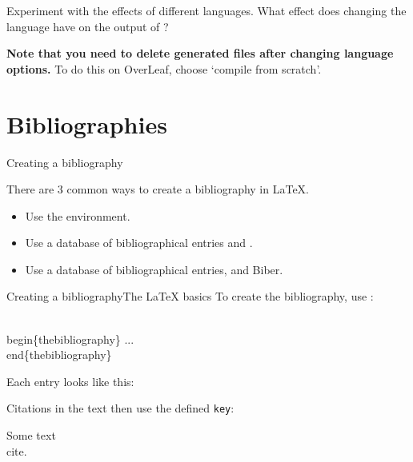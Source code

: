 \begin{exercise}
    Experiment with the effects of different languages.
    What effect does changing the language have on the output of ?

    \textbf{Note that you need to delete generated files after changing language options.}
    To do this on OverLeaf, choose ‘compile from scratch’.
\end{exercise}


\section{Bibliographies}

\begin{frame}{Creating a bibliography}

  There are 3 common ways to create a bibliography in \LaTeX{}.
  \begin{itemize}
	\item Use the  environment.
	\item Use a database of bibliographical entries and \BibTeX{}.
	\item Use a database of bibliographical entries,  and Biber.
  \end{itemize}

\end{frame}

\begin{frame}[fragile]{Creating a bibliography}{The \LaTeX{} basics}
  To create the bibliography, use :
  \begin{semiverbatim}
	\\begin\{thebibliography\}
	...
	\\end\{thebibliography\}
  \end{semiverbatim}
  \pause
  Each entry looks like this:
  \begin{semiverbatim}
	 
  \end{semiverbatim}
  Citations in the text then use the defined \texttt{key}:
  \begin{semiverbatim}
	  Some text \\cite{}.
  \end{semiverbatim}
\end{frame}

